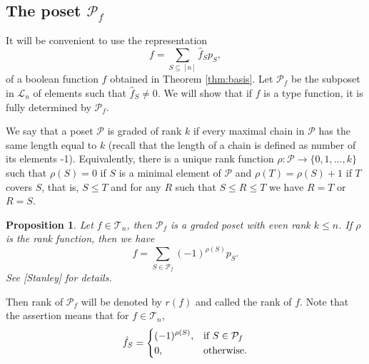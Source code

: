 \documentclass[12pt]{article}
\newtheorem{prop}{Proposition}
\theoremstyle{definition}
\theoremstyle{remark}
\def\Te{\mathcal T}
\def\Pe{\mathcal P}
\begin{document}
\subsection{The poset $\Pe_f$}


It will be convenient to use the representation 
\[
f=\sum_{S\subseteq [n]} \hat f_Sp_S,
\]
of a boolean function $f$ obtained in  Theorem  \ref{thm:basis}. Let $\mathcal P_f$ be the subposet in $\mathcal L_n$ of elements such that
$\hat f_S\ne 0$. We will show that if $f$ is a type function, it is fully determined by $\Pe_f$. %
 

 We say that a poset $\Pe$  is graded of rank
$k$ if every maximal chain in $\Pe$ has the same length equal to $k$ (recall that the length
of a chain is defined as number of its elements -1). Equivalently,  there is
a unique rank function $\rho: \Pe\to \{0,1,\dots,k\}$ such that $\rho(S)=0$ if $S$ is a
minimal element of $\Pe$ and $\rho(T)=\rho(S)+1$ if $T$ covers $S$, that is, $S\le T$ and for any $R$ such that
$S\le R\le T$ we have $R=T$ or $R=S$. 

\begin{prop}\label{prop:graded} Let $f\in \Te_n$, then $\mathcal P_f$ is a graded poset
with even rank $k\le n$. If $\rho$ is the rank function, then we have
\[
f=\sum_{S\in \mathcal P_f}(-1)^{\rho(S)}p_S.
\]
See [Stanley] for details.

\end{prop}

Then rank of $\Pe_f$ will be denoted by $r(f)$ and called the rank of $f$. Note that the
assertion means that for $f\in \Te_n$, 
\[
\hat f_S=\begin{dcases} (-1)^{\rho(S)},& \text{if } S\in \Pe_f\\
0, & \text{otherwise}.
\end{dcases}
\]
\end{document}
